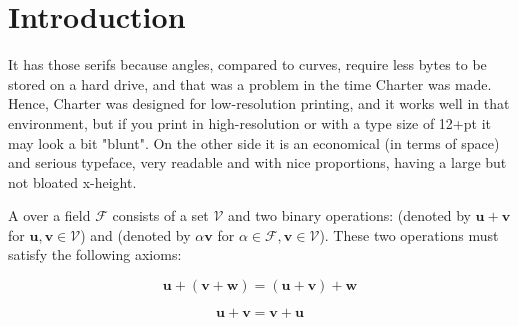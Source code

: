 \chapter{Introduction}

It has those serifs because angles, compared to curves, require less bytes to be stored on a hard drive, and that was a problem in the time Charter was made. Hence, Charter was designed for low-resolution printing, and it works well in that environment, but if you print in high-resolution or with a type size of 12+pt it may look a bit "blunt".
On the other side it is an economical (in terms of space) and serious typeface, very readable and with nice proportions, having a large but not bloated x-height.

\begin{definition}
A  over a field $\mathcal{F}$ consists of a set $\mathcal{V}$ and two binary operations:  (denoted by $\mathbf{u} + \mathbf{v}$ for $\mathbf{u}, \mathbf{v} \in \mathcal{V}$) and  (denoted by $\alpha \mathbf{v}$ for $\alpha \in \mathcal{F}, \mathbf{v} \in \mathcal{V}$). These two operations must satisfy the following axioms:


\begin{axiom}
	\begin{equation}
		\mathbf{u} + (\mathbf{v} + \mathbf{w}) = (\mathbf{u} + \mathbf{v}) + \mathbf{w}
    \end{equation}
\end{axiom}

\begin{axiom}
    \begin{equation}
    	\mathbf{u} + \mathbf{v} = \mathbf{v} + \mathbf{u}
    \end{equation}
\end{axiom}

\end{definition}

